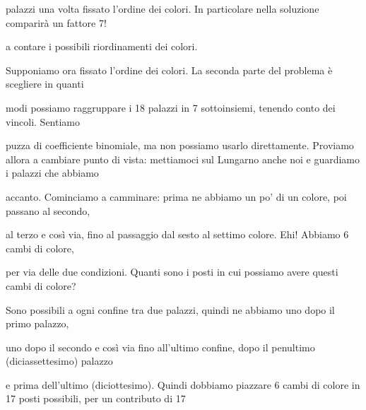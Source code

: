 \documentclass[a4paper,portrait,12pt]{article}
\begin{document}
\begin{flushleft}
palazzi una volta fissato l'ordine dei colori. In particolare nella soluzione comparir\`{a} un fattore 7!
\end{flushleft}


\begin{flushleft}
a contare i possibili riordinamenti dei colori.
\end{flushleft}


\begin{flushleft}
Supponiamo ora fissato l'ordine dei colori. La seconda parte del problema \`{e} scegliere in quanti
\end{flushleft}


\begin{flushleft}
modi possiamo raggruppare i 18 palazzi in 7 sottoinsiemi, tenendo conto dei vincoli. Sentiamo
\end{flushleft}


\begin{flushleft}
puzza di coefficiente binomiale, ma non possiamo usarlo direttamente. Proviamo allora a cambiare punto di vista: mettiamoci sul Lungarno anche noi e guardiamo i palazzi che abbiamo
\end{flushleft}


\begin{flushleft}
accanto. Cominciamo a camminare: prima ne abbiamo un po' di un colore, poi passano al secondo,
\end{flushleft}


\begin{flushleft}
al terzo e così via, fino al passaggio dal sesto al settimo colore. Ehi! Abbiamo 6 cambi di colore,
\end{flushleft}


\begin{flushleft}
per via delle due condizioni. Quanti sono i posti in cui possiamo avere questi cambi di colore?
\end{flushleft}


\begin{flushleft}
Sono possibili a ogni confine tra due palazzi, quindi ne abbiamo uno dopo il primo palazzo,
\end{flushleft}


\begin{flushleft}
uno dopo il secondo e così via fino all'ultimo confine, dopo il penultimo (diciassettesimo) palazzo
\end{flushleft}


\begin{flushleft}
e prima dell'ultimo (diciottesimo). Quindi dobbiamo piazzare 6 cambi di colore in 17 posti possibili, per un contributo di 17
\end{flushleft}
\end{document}
